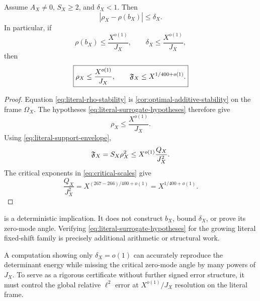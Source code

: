 \begin{theorem}
\label{thm:literal-surrogate-certificate}
Assume \(A_X\ne0\), \(S_X\ge2\), and \(\delta_X<1\).  Then
\begin{equation}
 |\rho_X-\rho(b_X)|\le\delta_X.
\label{eq:literal-rho-stability}
\end{equation}
In particular, if
\begin{equation}
 \rho(b_X)\le\frac{X^{o(1)}}{J_X},
 \qquad
 \delta_X\le\frac{X^{o(1)}}{J_X},
\label{eq:literal-surrogate-hypotheses}
\end{equation}
then
\begin{equation}
 \boxed{
 \rho_X\le\frac{X^{o(1)}}{J_X},
 \qquad
 \mathfrak F_X\le X^{1/400+o(1)}.}
\label{eq:literal-surrogate-conclusion}
\end{equation}
\end{theorem}

\begin{proof}
Equation \eqref{eq:literal-rho-stability} is
\cref{cor:optimal-additive-stability} on the frame \(\Omega_X\).
The hypotheses \eqref{eq:literal-surrogate-hypotheses} therefore
give
\[
 \rho_X\le\frac{X^{o(1)}}{J_X}.
\]
Using \eqref{eq:literal-support-envelope},
\[
 \mathfrak F_X
 =S_X\rho_X^2
 \le
 X^{o(1)}\frac{Q_X}{J_X^2}.
\]
The critical exponents in \eqref{eq:critical-scales} give
\[
 \frac{Q_X}{J_X^2}
 =
 X^{(267-266)/400+o(1)}
 =
 X^{1/400+o(1)}.
\]
\end{proof}

\begin{remark}
\label{rem:certificate-status}
 is a deterministic
implication.  It does not construct \(b_X\), bound \(\delta_X\), or
prove its zero-mode angle.  Verifying
\eqref{eq:literal-surrogate-hypotheses} for the growing literal
fixed-shift family is precisely additional arithmetic or structural
work.
\end{remark}

\begin{remark}
\label{rem:numerical-resolution}
A computation showing only
\(\delta_X=o(1)\) can accurately reproduce the determinant energy
while missing the critical zero-mode angle by many powers of
\(J_X\).  To serve as a rigorous certificate without further signed
error structure, it must control the global relative \(\ell^2\)
error at \(X^{o(1)}/J_X\) resolution on the literal frame.
\end{remark}

